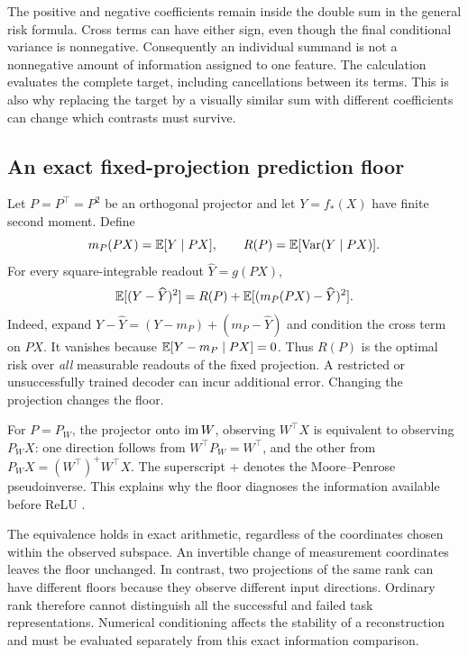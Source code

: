 The positive and negative coefficients remain inside the double sum in the
general risk formula. Cross terms can have either sign, even though the final
conditional variance is nonnegative. Consequently an individual summand is
not a nonnegative amount of information assigned to one feature. The
calculation evaluates the complete target, including cancellations between
its terms. This is also why replacing the target by a visually similar sum
with different coefficients can change which contrasts must survive.

\subsection{An exact fixed-projection prediction floor}
\label{qdo:floor}

Let $P=P^\top=P^2$ be an orthogonal projector and let $Y=f_*(X)$ have finite
second moment. Define
\begin{equation}
 m_P(PX)=\mathbb E[Y\mid PX],\qquad
 R(P)=\mathbb E[\operatorname{Var}(Y\mid PX)].
 \label{qdo:conditionalrisk}
\end{equation}
For every square-integrable readout $\widehat Y=g(PX)$,
\begin{equation}
 \mathbb E[(Y-\widehat Y)^2]
 =R(P)+\mathbb E[(m_P(PX)-\widehat Y)^2].
 \label{qdo:orthogonalrisk}
\end{equation}
Indeed, expand $Y-\widehat Y=(Y-m_P)+(m_P-\widehat Y)$ and condition the
cross term on $PX$. It vanishes because $\mathbb E[Y-m_P\mid PX]=0$.
Thus $R(P)$ is the optimal risk over \emph{all} measurable readouts of the
fixed projection. A restricted or unsuccessfully trained decoder can incur
additional error. Changing the projection changes the floor.

For $P=P_W$, the projector onto $\operatorname{im} W$, observing $W^\top X$ is equivalent
to observing $P_WX$: one direction follows from $W^\top P_W=W^\top$, and the
other from $P_WX=(W^\top)^+W^\top X$. The superscript $+$ denotes the
Moore--Penrose pseudoinverse. This explains why the floor diagnoses the
information available before ReLU \cite{projection}.

The equivalence holds in exact arithmetic, regardless of the coordinates
chosen within the observed subspace. An invertible change of measurement
coordinates leaves the floor unchanged. In contrast, two projections of the
same rank can have different floors because they observe different input
directions. Ordinary rank therefore cannot distinguish all the successful and
failed task representations. Numerical conditioning affects the stability of
a reconstruction and must be evaluated separately from this exact
information comparison.


